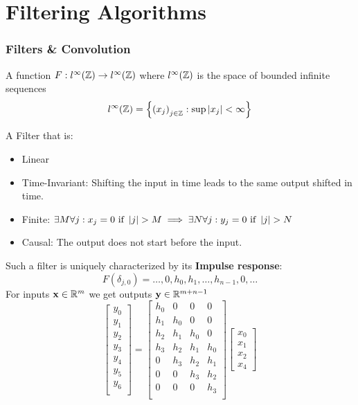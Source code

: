 \columnbreak

\part{Filtering Algorithms}
\setcounter{section}{0}

\section{Filters \& Convolution}

\Def[Filter] A function $F: l^\infty(\mathbb{Z}) \rightarrow l^\infty(\mathbb{Z})$ where $l^\infty(\mathbb{Z})$ is the space of bounded infinite sequences
$$
l^\infty(\mathbb{Z}) = \left\{\left(x_{j}\right)_{j \in \mathbb{Z}}: \sup \left|x_{j}\right|<\infty\right\}
$$

\Def[LT-FIR] A Filter that is: \begin{itemize}
	\item Linear
	\item Time-Invariant: Shifting the input in time leads to the same output shifted in time.
	\item Finite: $\exists M \forall j : x_j=0 \text{ if } \left\lvert j \right\rvert>M \implies \exists N \forall j : y_j=0 \text{ if } \left\lvert j \right\rvert>N$
	\item Causal: The output does not start before the input.
\end{itemize}
Such a filter is uniquely characterized by its \textbf{Impulse response}: $$F(\delta_{j, 0}) = \dots, 0, h_0, h_1, \dots, h_{n-1}, 0, \dots$$
For inputs $\mathbf{x} \in \mathbb{R}^m$ we get outputs $\mathbf{y} \in \mathbb{R}^{m+n-1}$
$$
\left[\begin{array}{l}
y_{0} \\
y_{1} \\
y_{2} \\
y_{3} \\
y_{4} \\
y_{5} \\
y_{6} \\
\end{array}\right]=\left[\begin{array}{cccc}
h_{0} & 0 & 0 & 0 \\
h_{1} & h_{0} & 0 & 0 \\
h_{2} & h_{1} & h_{0} & 0 \\
h_{3} & h_{2} & h_{1} & h_{0} \\
0 & h_{3} & h_{2} & h_{1} \\
0 & 0 & h_{3} & h_{2} \\
0 & 0 & 0 & h_{3} \\
\end{array}\right]\left[\begin{array}{l}
x_{0} \\
x_{1} \\
x_{2} \\
x_{4}
\end{array}\right]
$$

